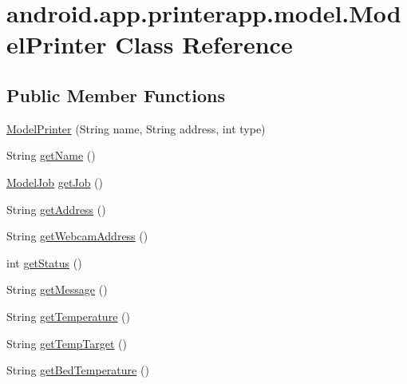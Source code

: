\hypertarget{classandroid_1_1app_1_1printerapp_1_1model_1_1_model_printer}{}\section{android.\+app.\+printerapp.\+model.\+Model\+Printer Class Reference}
\label{classandroid_1_1app_1_1printerapp_1_1model_1_1_model_printer}
\subsection*{Public Member Functions}
\begin{DoxyCompactItemize}
\item 
\hyperlink{classandroid_1_1app_1_1printerapp_1_1model_1_1_model_printer_a3fa83e6fe662ccc7aa02fd7085811f6d}{Model\+Printer} (String name, String address, int type)
\item 
String \hyperlink{classandroid_1_1app_1_1printerapp_1_1model_1_1_model_printer_a7588d32f0202cd305c8cf405a4f6a783}{get\+Name} ()
\item 
\hyperlink{classandroid_1_1app_1_1printerapp_1_1model_1_1_model_job}{Model\+Job} \hyperlink{classandroid_1_1app_1_1printerapp_1_1model_1_1_model_printer_a483edd5ad8e6f569780519db3fa418b1}{get\+Job} ()
\item 
String \hyperlink{classandroid_1_1app_1_1printerapp_1_1model_1_1_model_printer_a45519ec76d60c5a5aee62cde6c8f7368}{get\+Address} ()
\item 
String \hyperlink{classandroid_1_1app_1_1printerapp_1_1model_1_1_model_printer_a3c09fea466b67f55ea9d454039b97e87}{get\+Webcam\+Address} ()
\item 
int \hyperlink{classandroid_1_1app_1_1printerapp_1_1model_1_1_model_printer_a0553700adfd65a5963f2747dabc897f6}{get\+Status} ()
\item 
String \hyperlink{classandroid_1_1app_1_1printerapp_1_1model_1_1_model_printer_a7747b536fbc187081ed38b19ef2a59c8}{get\+Message} ()
\item 
String \hyperlink{classandroid_1_1app_1_1printerapp_1_1model_1_1_model_printer_a0b07fc45349708630db72a1190a374e4}{get\+Temperature} ()
\item 
String \hyperlink{classandroid_1_1app_1_1printerapp_1_1model_1_1_model_printer_ac1ec5fcc508c66aab9e0ad95c97dfac9}{get\+Temp\+Target} ()
\item 
String \hyperlink{classandroid_1_1app_1_1printerapp_1_1model_1_1_model_printer_af064052d78beee31410d25b12d29f791}{get\+Bed\+Temperature} ()

\end{DoxyCompactItemize}
